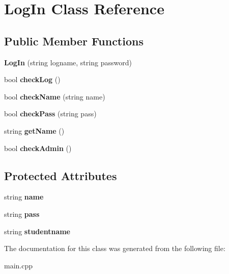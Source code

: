 \hypertarget{class_log_in}{}\section{Log\+In Class Reference}
\label{class_log_in}
\subsection*{Public Member Functions}
\begin{DoxyCompactItemize}
\item 
\hypertarget{class_log_in_aa42c288c1b5ce9b2047cd6f9faac1fa0}{}{\bfseries Log\+In} (string logname, string password)\label{class_log_in_aa42c288c1b5ce9b2047cd6f9faac1fa0}

\item 
\hypertarget{class_log_in_a786a8b2d2219369f8b23b010874b4edf}{}bool {\bfseries check\+Log} ()\label{class_log_in_a786a8b2d2219369f8b23b010874b4edf}

\item 
\hypertarget{class_log_in_a534dda0d6dee8df537602ba50ce15a69}{}bool {\bfseries check\+Name} (string name)\label{class_log_in_a534dda0d6dee8df537602ba50ce15a69}

\item 
\hypertarget{class_log_in_a846d4f71035d32127150d69669c0a700}{}bool {\bfseries check\+Pass} (string pass)\label{class_log_in_a846d4f71035d32127150d69669c0a700}

\item 
\hypertarget{class_log_in_a003be39a5a47bdaba9020b3b8c23009e}{}string {\bfseries get\+Name} ()\label{class_log_in_a003be39a5a47bdaba9020b3b8c23009e}

\item 
\hypertarget{class_log_in_a3f42195d05b06ebc1a388b1e72f8ad1d}{}bool {\bfseries check\+Admin} ()\label{class_log_in_a3f42195d05b06ebc1a388b1e72f8ad1d}

\end{DoxyCompactItemize}
\subsection*{Protected Attributes}
\begin{DoxyCompactItemize}
\item 
\hypertarget{class_log_in_a2aa15b300d5b73dc57e9d62282f1990f}{}string {\bfseries name}\label{class_log_in_a2aa15b300d5b73dc57e9d62282f1990f}

\item 
\hypertarget{class_log_in_a1b1b65ba8a873b01dac2af9ec720611c}{}string {\bfseries pass}\label{class_log_in_a1b1b65ba8a873b01dac2af9ec720611c}

\item 
\hypertarget{class_log_in_ad26675da08096c0d040468b9af4ab3e5}{}string {\bfseries studentname}\label{class_log_in_ad26675da08096c0d040468b9af4ab3e5}

\end{DoxyCompactItemize}


The documentation for this class was generated from the following file\+:\begin{DoxyCompactItemize}
\item 
main.\+cpp\end{DoxyCompactItemize}
